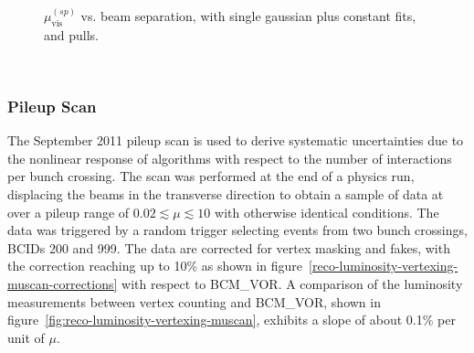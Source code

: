 \begin{figure}[p]
{	}
	\\
	\caption{$\mu_{\textrm{vis}}^{(sp)}$ vs. beam separation, with single gaussian plus constant fits, and pulls.}
	\label{fig:reco-luminosity-vertex-vdm}
\end{figure}

\ 

\subsubsection{Pileup Scan}

The September 2011 pileup scan is used to derive systematic uncertainties due to the nonlinear response of algorithms with respect to the number of interactions per bunch crossing. The scan was performed at the end of a physics run, displacing the beams in the transverse direction to obtain a sample of data at over a pileup range of $0.02\lesssim \mu \lesssim 10$ with otherwise identical conditions. The data was triggered by a random trigger selecting events from two bunch crossings, BCIDs 200 and 999. The data are corrected for vertex masking and fakes, with the correction reaching up to 10\% as shown in figure~\ref{reco-luminosity-vertexing-muscan-corrections} with respect to BCM\_VOR. A comparison of the luminosity measurements between vertex counting and BCM\_VOR, shown in figure~\ref{fig:reco-luminosity-vertexing-muscan}, exhibits a slope of about 0.1\% per unit of $\mu$.

